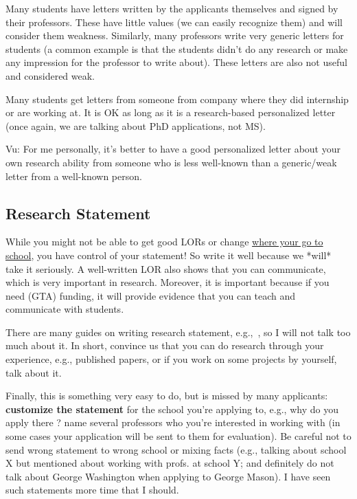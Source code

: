 \documentclass[10pt]{article}
\begin{document}
Many students have letters written by the applicants themselves and signed by their professors. These have little
values (we can easily recognize them) and will consider them weakness.
Similarly, many professors write very generic letters for students (a common example is that the students didn't do any
research or make any impression for the professor to write about). These
letters are also not useful and considered weak.

Many students get letters from someone from company where they did internship or are
working at. It is OK as long as it is a research-based personalized
letter (once again, we are talking about PhD applications, not MS).


\begin{tcolorbox}[left=1pt,right=1pt,top=1pt,bottom=1pt]
Vu: For me personally, it's better to have a good personalized
letter about your own research ability from someone who is less
well-known than a generic/weak letter from a well-known person.
\end{tcolorbox}

\subsection{Research Statement}\label{sec:research-statement}

While you might not be able to get good LORs or change
\hyperref[sec:your-school]{where your go to school}, you have control of your
statement! So write it well because we *will* take it seriously.
A well-written LOR also shows that you can communicate, which is very important in research. Moreover, it
is important because if you need (GTA) funding, it will provide evidence
that you can teach and communicate with students.

There are many guides on writing research statement, e.g.,~\cite{blattman2022writing},
so I will not talk too much about it. In short, convince us that you can
do research through your experience, e.g., published papers, or if you work on some projects by yourself, talk about it.

Finally, this is something very easy to do, but is missed by many
applicants: \textbf{customize the statement} for the school you're applying to,
e.g., why do you apply there ? name several professors who you're
interested in working with (in some cases your application will be sent to them for evaluation).
Be careful not to send wrong statement to wrong school or mixing
facts (e.g., talking about school X but mentioned about working with
profs. at school Y; and definitely do not talk about George Washington when applying to George Mason). I have seen such statements more time that I
should.
\end{document}
